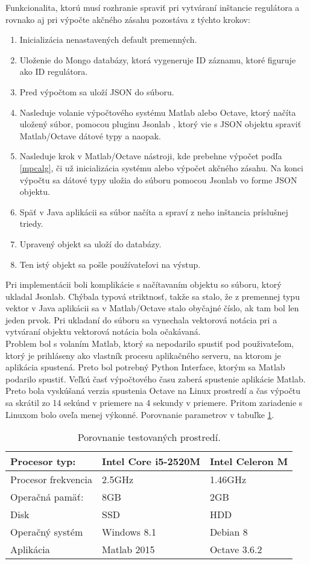 Funkcionalita, ktorú musí rozhranie spraviť pri vytváraní inštancie regulátora a rovnako aj pri výpočte akčného zásahu pozostáva z týchto krokov:
\begin{enumerate}
  \item Inicializácia nenastavených default premenných.
  \item Uloženie do Mongo databázy, ktorá vygeneruje ID záznamu, ktoré figuruje ako ID regulátora.
  \item  Pred výpočtom sa uloží JSON do súboru.  
  \item Nasleduje volanie výpočtového systému Matlab alebo
   Octave, ktorý načíta uložený súbor, pomocou pluginu Jsonlab \cite{IOT29}, ktorý vie s JSON objektu spraviť Matlab/Octave dátové typy a naopak.
  \item Nasleduje krok v Matlab/Octave nástroji, kde prebehne výpočet podľa \ref{mpcalg}, či už inicializácia systému alebo výpočet akčného zásahu. Na konci výpočtu sa dátové typy uložia do súboru pomocou Jsonlab vo forme JSON objektu.
  \item Späť v Java aplikácii sa súbor načíta a spraví z neho inštancia príslušnej triedy. 
  \item Upravený objekt sa uloží do databázy.
  \item Ten istý objekt sa pošle používateľovi na výstup.
\end{enumerate} 
Pri implementácii boli komplikácie s načítavaním objektu so súboru, ktorý ukladal Jsonlab. Chýbala typová striktnosť, takže sa stalo, že z premennej typu vektor v Java aplikácii sa v Matlab/Octave stalo obyčajné číslo, ak tam bol len jeden prvok. Pri ukladaní do súboru sa vynechala vektorová notácia pri a  vytváraní objektu vektorová notácia bola očakávaná.\\
\indent Problem bol s volaním Matlab, ktorý sa nepodarilo spustiť pod použivateľom, ktorý je prihláseny ako vlastník procesu aplikačného serveru, na ktorom je aplikácia spustená. Preto bol potrebný Python Interface, ktorým sa Matlab podarilo spustiť. Veľkú časť výpočtového času zaberá spustenie aplikácie Matlab. Preto bola vyskúšaná verzia spustenia Octave na Linux prostredí a čas výpočtu sa skrátil zo 14 sekúnd v priemere na 4 sekundy v priemere. Pritom zariadenie s Linuxom bolo oveľa menej výkonné. Porovnanie parametrov v tabuľke  \ref{table:2}.
\begin{table}[h!]
\centering
 \caption{Porovnanie testovaných prostredí.}
 \begin{tabular}{ |p{4cm}|p{5.5cm}p{5.5cm}| } 
 \hline
 Procesor typ: & Intel Core i5-2520M & Intel Celeron M \\ 
  \hline
 Procesor frekvencia &  2.5GHz  & 1.46GHz   \\ 
 \hline
 Operačná pamäť: & 8GB & 2GB  \\ 
 \hline
 Disk & SSD & HDD \\
 \hline
 Operačný systém & Windows 8.1 & Debian 8 \\ 
 \hline
 Aplikácia & Matlab 2015 & Octave 3.6.2 \\  
 \hline
\end{tabular}
\label{table:2}
\end{table}
